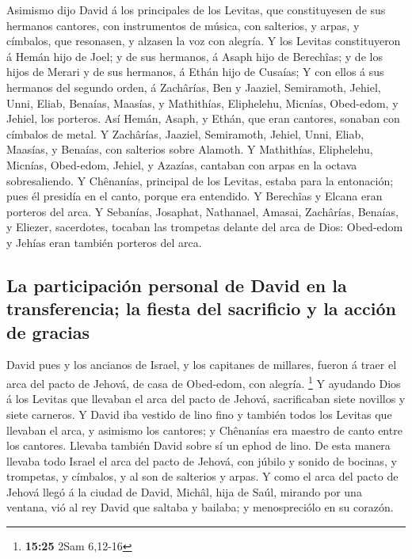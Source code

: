  Asimismo dijo David á los principales de los Levitas,
que constituyesen de sus hermanos cantores, con instrumentos de música,
con salterios, y arpas, y címbalos, que resonasen, y alzasen la voz con
alegría.  Y los Levitas constituyeron á Hemán hijo de
Joel; y de sus hermanos, á Asaph hijo de Berechîas; y de los hijos de
Merari y de sus hermanos, á Ethán hijo de Cusaías;  Y con
ellos á sus hermanos del segundo orden, á Zachârías, Ben y Jaaziel,
Semiramoth, Jehiel, Unni, Eliab, Benaías, Maasías, y Mathithías,
Eliphelehu, Micnías, Obed-edom, y Jehiel, los porteros. 
Así Hemán, Asaph, y Ethán, que eran cantores, sonaban con címbalos de
metal.  Y Zachârías, Jaaziel, Semiramoth, Jehiel, Unni,
Eliab, Maasías, y Benaías, con salterios sobre Alamoth. 
Y Mathithías, Eliphelehu, Micnías, Obed-edom, Jehiel, y Azazías,
cantaban con arpas en la octava sobresaliendo.  Y
Chênanías, principal de los Levitas, estaba para la entonación; pues él
presidía en el canto, porque era entendido.  Y Berechîas
y Elcana eran porteros del arca.  Y Sebanías, Josaphat,
Nathanael, Amasai, Zachârías, Benaías, y Eliezer, sacerdotes, tocaban
las trompetas delante del arca de Dios: Obed-edom y Jehías eran también
porteros del arca.

\hypertarget{la-participaciuxf3n-personal-de-david-en-la-transferencia-la-fiesta-del-sacrificio-y-la-acciuxf3n-de-gracias}{%
\subsection{La participación personal de David en la transferencia; la
fiesta del sacrificio y la acción de
gracias}\label{la-participaciuxf3n-personal-de-david-en-la-transferencia-la-fiesta-del-sacrificio-y-la-acciuxf3n-de-gracias}}

 David pues y los ancianos de Israel, y los capitanes de
millares, fueron á traer el arca del pacto de Jehová, de casa de
Obed-edom, con alegría. \footnote{\textbf{15:25} 2Sam 6,12-16}
 Y ayudando Dios á los Levitas que llevaban el arca del
pacto de Jehová, sacrificaban siete novillos y siete carneros.
 Y David iba vestido de lino fino y también todos los
Levitas que llevaban el arca, y asimismo los cantores; y Chênanías era
maestro de canto entre los cantores. Llevaba también David sobre sí un
ephod de lino.  De esta manera llevaba todo Israel el
arca del pacto de Jehová, con júbilo y sonido de bocinas, y trompetas, y
címbalos, y al son de salterios y arpas.  Y como el arca
del pacto de Jehová llegó á la ciudad de David, Michâl, hija de Saúl,
mirando por una ventana, vió al rey David que saltaba y bailaba; y
menospreciólo en su corazón.

